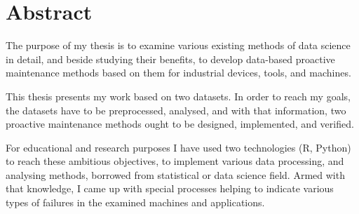 \chapter*{Abstract}

The purpose of my thesis is to examine various existing methods of data science in detail, and beside studying their benefits, to develop data-based proactive maintenance methods based on them for industrial devices, tools, and machines.

This thesis presents my work based on two datasets. In order to reach my goals, the datasets have to be preprocessed, analysed, and with that information, two proactive maintenance methods ought to be designed, implemented, and verified.

For educational and research purposes I have used two technologies (R, Python) to reach these ambitious objectives, to implement various data processing, and analysing methods, borrowed from statistical or data science field. Armed with that knowledge, I came up with special processes helping to indicate various types of failures in the examined machines and applications.